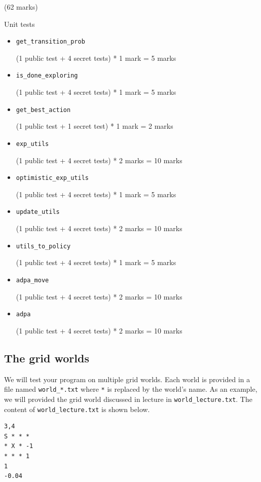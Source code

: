 \documentclass[12pt]{article}
\begin{document}
\begin{markscheme}
(62 marks)

Unit tests
\begin{itemize}
\item \verb+get_transition_prob+

    (1 public test + 4 secret tests) * 1 mark = 5 marks

\item \verb+is_done_exploring+

    (1 public test + 4 secret tests) * 1 mark = 5 marks

\item \verb+get_best_action+

    (1 public test + 1 secret test) * 1 mark = 2 marks
    
\item \verb+exp_utils+

    (1 public test + 4 secret tests) * 2 marks = 10 marks

\item \verb+optimistic_exp_utils+

    (1 public test + 4 secret tests) * 1 mark = 5 marks

\item \verb+update_utils+

    (1 public test + 4 secret tests) * 2 marks = 10 marks

\item \verb+utils_to_policy+

    (1 public test + 4 secret tests) * 1 mark = 5 marks

\item \verb+adpa_move+

    (1 public test + 4 secret tests) * 2 marks = 10 marks
    
\item \verb+adpa+

    (1 public test + 4 secret tests) * 2 marks = 10 marks

\end{itemize}

\end{markscheme}

\subsection{The grid worlds}
\label{sec:worlds}

We will test your program on multiple grid worlds. Each world is provided in a file named \verb+world_*.txt+ where \verb+*+ is replaced by the world's name. As an example, we will provided the grid world discussed in lecture in \verb+world_lecture.txt+. The content of \verb+world_lecture.txt+ is shown below.
%
\begin{verbatim}
3,4
S * * *
* X * -1
* * * 1
1
-0.04
\end{verbatim}
\end{document}
